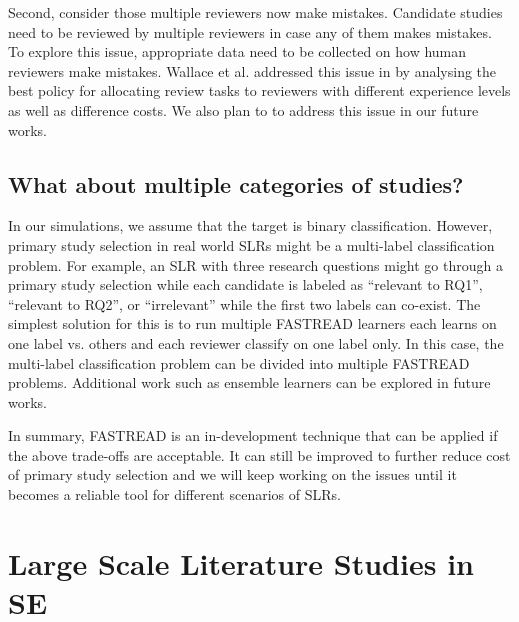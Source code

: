 \documentclass[final,twocolumn,5p]{elsarticle}
\theoremstyle{break}
\begin{document}
Second, consider those multiple reviewers now make mistakes. Candidate studies need to be reviewed by multiple reviewers in case any of them makes mistakes. To explore this issue, appropriate data need to be collected on how human reviewers make mistakes. Wallace et al. addressed this issue in \cite{nguyen2015combining} by analysing the best policy for allocating review tasks to reviewers with different experience levels as well as difference costs. We also plan to to address this issue in our future works.


\subsection{What about multiple categories of studies?}

In our simulations, we assume that the target is binary classification. However, primary study selection in real world SLRs might be a multi-label classification problem. For example, an SLR with three research questions might go through a primary study selection while each candidate is labeled as ``relevant to RQ1'', ``relevant to RQ2'', or ``irrelevant'' while the first two labels can co-exist. The simplest solution for this is to run multiple FASTREAD learners each learns on one label vs. others and each reviewer classify on one label only. In this case, the multi-label classification problem can be divided into multiple FASTREAD problems. Additional work such as ensemble learners can be explored in future works.

In summary, FASTREAD is an in-development technique that can be applied if the above trade-offs are acceptable. It can still be improved to further reduce cost of primary study selection and we will keep working on the issues until it becomes a reliable tool for different scenarios of SLRs.

























\section{Large Scale Literature Studies in SE}
\label{sect: Background}
\end{document}
